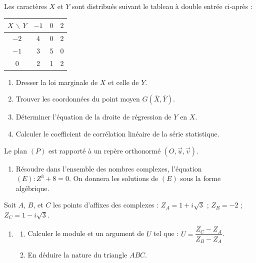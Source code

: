 \documentclass[11pt]{article}
\begin{document}


Les caractères $X$ et $Y$ sont distribués suivant le tableau à double entrée ci-après :

\begin{center}
\renewcommand{\arraystretch}{1.3}
\begin{tabular}{|c|c|c|c|}
\hline
$X\,\backslash\,Y$ & $-1$ & $0$ & $2$ \\
\hline
$-2$ & 4 & 0 & 2 \\
\hline
$-1$ & 3 & 5 & 0 \\
\hline
$0$ & 2 & 1 & 2 \\
\hline
\end{tabular}
\end{center}

\begin{enumerate}
  \item Dresser la loi marginale de $X$ et celle de $Y$.
  \item Trouver les coordonnées du point moyen $G(\overline{X},\overline{Y})$.
  \item Déterminer l'équation de la droite de régression de $Y$ en $X$.
  \item Calculer le coefficient de corrélation linéaire de la série statistique.
\end{enumerate}


Le plan $(P)$ est rapporté à un repère orthonormé $(O,\vec{u},\vec{v})$.

\begin{enumerate}
  \item Résoudre dans l'ensemble des nombres complexes, l'équation $(E) : Z^3 + 8 = 0$. On donnera les solutions de $(E)$ sous la forme algébrique.
\end{enumerate}

Soit $A$, $B$, et $C$ les points d'affixes des complexes : $Z_A = 1 + i\sqrt{3}$ ; $Z_B = -2$ ; $Z_C = 1 - i\sqrt{3}$.

\begin{enumerate}[start=2]
  \item \begin{enumerate}[label=\alph*.]
    \item Calculer le module et un argument de $U$ tel que : $U = \dfrac{Z_C - Z_A}{Z_B - Z_A}$.
    \item En déduire la nature du triangle $ABC$.
  \end{enumerate}
\end{enumerate}
\end{document}
